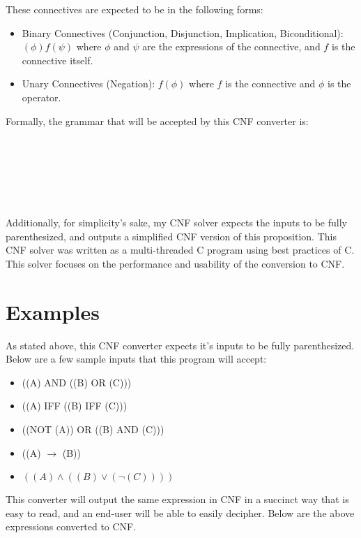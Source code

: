 \documentclass[12pt]{report}
\begin{document}
\noindent These connectives are expected to be in the following forms:

\begin{itemize}
    \item Binary Connectives (Conjunction, Disjunction, Implication, Biconditional): $(\phi) f (\psi)$ where $\phi$ and $\psi$ are the expressions of the connective, and $f$ is the connective itself.
    \item Unary Connectives (Negation): $f (\phi)$ where $f$ is the connective and $\phi$ is the operator.
\end{itemize}

\noindent Formally, the grammar that will be accepted by this CNF converter is:\\
\begin{grammar}
    \\
        \\
        \\
    \\
    \\
\end{grammar}

\noindent Additionally, for simplicity's sake, my CNF solver expects the inputs to be fully parenthesized, and outputs a simplified CNF version of this proposition. This CNF solver was written as a multi-threaded C program using best practices of C. This solver focuses on the performance and usability of the conversion to CNF.\\

\section*{Examples}
\noindent As stated above, this CNF converter expects it's inputs to be fully parenthesized. Below are a few sample inputs that this program will accept:
    \begin{itemize}
        \setlength\itemsep{.1em}
        \item ((A) AND ((B) OR (C)))
        \item ((A) IFF ((B) IFF (C)))
        \item ((NOT (A)) OR ((B) AND (C)))
        \item ((A) $\rightarrow$ (B))
        \item $((A) \land ((B) \lor ( \lnot (C))))$
    \end{itemize}
\noindent This converter will output the same expression in  CNF in a succinct way that is easy to read, and an end-user will be able to easily decipher. Below are the above expressions converted to CNF.
\end{document}
